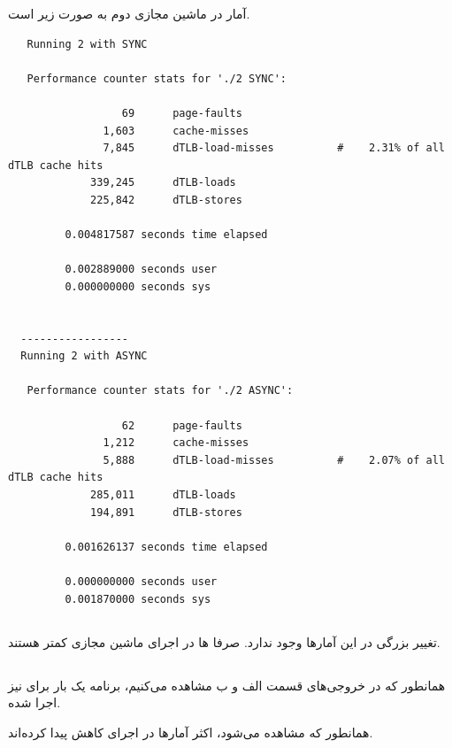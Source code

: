 \documentclass{article}
\begin{document}
آمار در ماشین مجازی دوم به صورت زیر است.
\begin{latin}
\begin{lstlisting}
   Running 2 with SYNC

   Performance counter stats for './2 SYNC':
  
                  69      page-faults                                                 
               1,603      cache-misses                                                
               7,845      dTLB-load-misses          #    2.31% of all dTLB cache hits 
             339,245      dTLB-loads                                                  
             225,842      dTLB-stores                                                 
  
         0.004817587 seconds time elapsed
  
         0.002889000 seconds user
         0.000000000 seconds sys
  
  
  -----------------
  Running 2 with ASYNC
  
   Performance counter stats for './2 ASYNC':
  
                  62      page-faults                                                 
               1,212      cache-misses                                                
               5,888      dTLB-load-misses          #    2.07% of all dTLB cache hits 
             285,011      dTLB-loads                                                  
             194,891      dTLB-stores                                                 
  
         0.001626137 seconds time elapsed
  
         0.000000000 seconds user
         0.001870000 seconds sys
\end{lstlisting}
\end{latin}

\subsection{}
تغییر بزرگی در این آمار‌ها وجود ندارد. صرفا 
ها 
در اجرای ماشین مجازی کمتر هستند.

\subsection{}
همانطور که در خروجی‌های قسمت الف و ب مشاهده می‌کنیم،‌ برنامه یک بار 
برای 
نیز اجرا شده. 

همانطور که مشاهده می‌شود، اکثر آمارها در اجرای 
کاهش پیدا کرده‌اند. 
\end{document}
